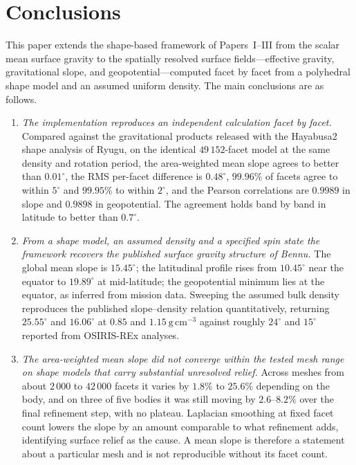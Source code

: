 \section{Conclusions}
\label{sec:conclusions}

This paper extends the shape-based framework of Papers~I--III from the scalar
mean surface gravity to the spatially resolved surface fields---effective
gravity, gravitational slope, and geopotential---computed facet by facet from a
polyhedral shape model and an assumed uniform density. The main conclusions are
as follows.

\begin{enumerate}

\item \emph{The implementation reproduces an independent calculation facet by
facet.} Compared against the gravitational products released with the Hayabusa2
shape analysis of Ryugu, on the identical $49\,152$-facet model at the same
density and rotation period, the area-weighted mean slope agrees to better than
$0.01^{\circ}$, the RMS per-facet difference is $0.48^{\circ}$, $99.96\%$ of
facets agree to within $5^{\circ}$ and $99.95\%$ to within $2^{\circ}$, and the
Pearson
correlations are $0.9989$ in slope and $0.9898$ in geopotential. The agreement
holds band by band in latitude to better than $0.7^{\circ}$.

\item \emph{From a shape model, an assumed density and a specified spin state
the framework recovers the published surface gravity structure of Bennu.} The global mean slope is
$15.45^{\circ}$; the latitudinal profile rises from $10.45^{\circ}$ near the
equator to $19.89^{\circ}$ at mid-latitude; the geopotential minimum lies at the
equator, as inferred from mission data. Sweeping the assumed bulk density
reproduces the published slope--density relation quantitatively, returning
$25.55^{\circ}$ and $16.06^{\circ}$ at $0.85$ and $1.15\ \mathrm{g\,cm^{-3}}$
against roughly $24^{\circ}$ and $15^{\circ}$ reported from OSIRIS-REx analyses.

\item \emph{The area-weighted mean slope did not converge within the tested
mesh range on shape models that carry substantial unresolved relief.} Across
meshes from about $2\,000$ to $42\,000$ facets it varies by $1.8\%$ to $25.6\%$
depending on the body, and on three of five bodies it was still moving by
$2.6$--$8.2\%$ over the final refinement step, with no plateau. Laplacian
smoothing at fixed facet count lowers the slope by an amount comparable to what
refinement adds, identifying surface relief as the cause. A mean slope is
therefore a statement about a particular mesh and is not reproducible without
its facet count.


\end{enumerate}
